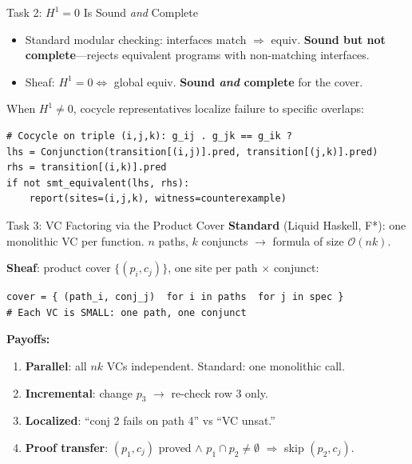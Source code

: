 \documentclass[aspectratio=169,10pt]{beamer}
\begin{document}
\begin{frame}[fragile]{Task 2: $H^1 = 0$ Is Sound \emph{and} Complete}
\begin{center}
\end{center}

\vspace{0.3em}
\begin{itemize}\small
  \item Standard modular checking: interfaces match $\Rightarrow$ equiv.
        \textbf{Sound but not complete}---rejects equivalent programs
        with non-matching interfaces.
  \item Sheaf: $H^1\!=\!0 \Leftrightarrow$ global equiv.
        \textbf{Sound \emph{and} complete} for the cover.
\end{itemize}

\vspace{0.2em}
When $H^1 \neq 0$, cocycle representatives localize failure to
specific overlaps:

\begin{lstlisting}
# Cocycle on triple (i,j,k): g_ij . g_jk == g_ik ?
lhs = Conjunction(transition[(i,j)].pred, transition[(j,k)].pred)
rhs = transition[(i,k)].pred
if not smt_equivalent(lhs, rhs):
    report(sites=(i,j,k), witness=counterexample)
\end{lstlisting}
\end{frame}

\begin{frame}[fragile]{Task 3: VC Factoring via the Product Cover}
\textbf{Standard} (Liquid Haskell, F*): one monolithic VC per function.
$n$ paths, $k$ conjuncts $\to$ formula of size $\mathcal{O}(nk)$.

\vspace{0.2em}
\textbf{Sheaf}: product cover $\{(p_i, c_j)\}$, one site per path $\times$ conjunct:

\begin{lstlisting}
cover = { (path_i, conj_j)  for i in paths  for j in spec }
# Each VC is SMALL: one path, one conjunct
\end{lstlisting}

\vspace{0.2em}
\textbf{Payoffs:}
\begin{enumerate}\small
  \item \textbf{Parallel}: all $nk$ VCs independent. Standard: one monolithic call.
  \item \textbf{Incremental}: change $p_3$ $\to$ re-check row 3 only.
  \item \textbf{Localized}: ``conj 2 fails on path 4'' vs ``VC unsat.''
  \item \textbf{Proof transfer}: $(p_1, c_j)$ proved $\land$
        $p_1 \cap p_2 \neq \emptyset$ $\Rightarrow$ skip $(p_2, c_j)$.
\end{enumerate}
\end{frame}
\end{document}
